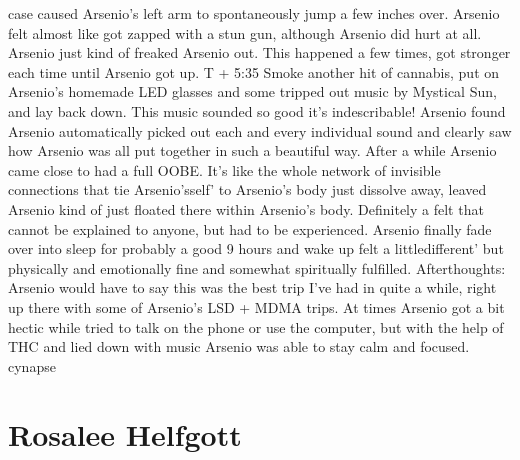 \documentclass[12pt]{book}
\begin{document}
case caused Arsenio's left arm to spontaneously jump a few inches over. Arsenio felt almost like got zapped with a stun gun, although Arsenio did hurt at all. Arsenio just kind of freaked Arsenio out. This happened a few times, got stronger each time until Arsenio got up. T + 5:35 Smoke another hit of cannabis, put on Arsenio's homemade LED glasses and some tripped out music by Mystical Sun, and lay back down. This music sounded so good it's indescribable! Arsenio found Arsenio automatically picked out each and every individual sound and clearly saw how Arsenio was all put together in such a beautiful way. After a while Arsenio came close to had a full OOBE. It's like the whole network of invisible connections that tie Arsenio'sself' to Arsenio's body just dissolve away, leaved Arsenio kind of just floated there within Arsenio's body. Definitely a felt that cannot be explained to anyone, but had to be experienced. Arsenio finally fade over into sleep for probably a good 9 hours and wake up felt a littledifferent' but physically and emotionally fine and somewhat spiritually fulfilled. Afterthoughts: Arsenio would have to say this was the best trip I've had in quite a while, right up there with some of Arsenio's LSD + MDMA trips. At times Arsenio got a bit hectic while tried to talk on the phone or use the computer, but with the help of THC and lied down with music Arsenio was able to stay calm and focused. cynapse






\chapter{Rosalee Helfgott}
\end{document}
